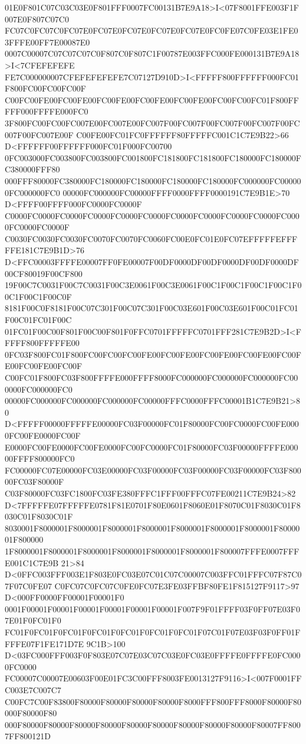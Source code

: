 01E0F801C07C03C03E0F801FFF0007FC00131B7E9A18>I<07F8001FFE003F1F007E0F807C07C0
FC07C0FC07C0FC07E0FC07E0FC07E0FC07E0FC07E0FC0FE07C0FE03E1FE03FFFE00FF7E00087E0
0007C00007C07C07C07C0F807C0F807C1F00787E003FFC000FE000131B7E9A18>I<7CFEFEFEFE
FE7C000000007CFEFEFEFEFE7C07127D910D>I<FFFFF800FFFFFF000FC01F800FC00FC00FC00F
C00FC00FE00FC00FE00FC00FE00FC00FE00FC00FE00FC00FC00FC01F800FFFFF000FFFFE000FC0
3F800FC00FC00FC007E00FC007E00FC007F00FC007F00FC007F00FC007F00FC007F00FC007E00F
C00FE00FC01FC0FFFFFF80FFFFFC001C1C7E9B22>66 D<FFFFFF00FFFFFF000FC01F000FC00700
0FC003000FC003800FC003800FC001800FC181800FC181800FC180000FC180000FC380000FFF80
000FFF80000FC380000FC180000FC180000FC180000FC180000FC000000FC000000FC000000FC0
00000FC000000FC00000FFFF0000FFFF0000191C7E9B1E>70 D<FFFF00FFFF000FC0000FC0000F
C0000FC0000FC0000FC0000FC0000FC0000FC0000FC0000FC0000FC0000FC0000FC0000FC0000F
C0030FC0030FC0030FC0070FC0070FC0060FC00E0FC01E0FC07EFFFFFEFFFFFE181C7E9B1D>76
D<FFC00003FFFFE00007FF0FE00007F00DF0000DF00DF0000DF00DF0000DF00CF80019F00CF800
19F00C7C0031F00C7C0031F00C3E0061F00C3E0061F00C1F00C1F00C1F00C1F00C1F00C1F00C0F
8181F00C0F8181F00C07C301F00C07C301F00C03E601F00C03E601F00C01FC01F00C01FC01F00C
01FC01F00C00F801F00C00F801F0FFC0701FFFFFC0701FFF281C7E9B2D>I<FFFFF800FFFFFE00
0FC03F800FC01F800FC00FC00FC00FE00FC00FE00FC00FE00FC00FE00FC00FE00FC00FE00FC00F
C00FC01F800FC03F800FFFFE000FFFF8000FC000000FC000000FC000000FC000000FC000000FC0
00000FC000000FC000000FC000000FC00000FFFC0000FFFC00001B1C7E9B21>80
D<FFFFF00000FFFFFE00000FC03F00000FC01F80000FC00FC0000FC00FE0000FC00FE0000FC00F
E0000FC00FE0000FC00FE0000FC00FC0000FC01F80000FC03F00000FFFFE00000FFFF800000FC0
FC00000FC07E00000FC03E00000FC03F00000FC03F00000FC03F00000FC03F80000FC03F80000F
C03F80000FC03FC1800FC03FE380FFFC1FFF00FFFC07FE00211C7E9B24>82
D<7FFFFFE07FFFFFE0781F81E0701F80E0601F8060E01F8070C01F8030C01F8030C01F8030C01F
8030001F8000001F8000001F8000001F8000001F8000001F8000001F8000001F8000001F800000
1F8000001F8000001F8000001F8000001F8000001F8000001F800007FFFE0007FFFE001C1C7E9B
21>84 D<0FFC003FFF003E1F803E0FC03E07C01C07C00007C003FFC01FFFC07F87C07F07C0FE07
C0FC07C0FC07C0FE0FC07E3FE03FFBF80FE1F815127F9117>97 D<000FF0000FF00001F00001F0
0001F00001F00001F00001F00001F00001F00001F007F9F01FFFF03F0FF07E03F07E01F0FC01F0
FC01F0FC01F0FC01F0FC01F0FC01F0FC01F0FC01F07C01F07E03F03F0FF01FFFFE07F1FE171D7E
9C1B>100 D<03FC000FFF003F0F803E07C07E03C07C03E0FC03E0FFFFE0FFFFE0FC0000FC0000
FC00007C00007E00603F00E01FC3C00FFF8003FE0013127F9116>I<007F0001FFC003E7C007C7
C00FC7C00F83800F80000F80000F80000F80000F8000FFF800FFF8000F80000F80000F80000F80
000F80000F80000F80000F80000F80000F80000F80000F80000F80000F80007FF8007FF800121D
